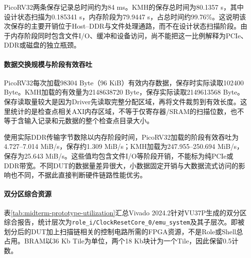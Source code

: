 PicoRV32两条保存记录总时间约为84 ms。KMH的保存总时间为80.1357 s，其中设计状态扫描为0.185341 s，内存阶段为79.9447 s，占总时间约99.76\%。这说明该次保存的主要开销位于Host--DDR与文件处理通路，而不在设计状态扫描阶段。由于内存阶段同时包含文件I/O、缓冲和设备访问，尚不能把这一比例解释为PCIe、DDR或磁盘的独立瓶颈。

\paragraph{数据交换规模与阶段有效吞吐}

PicoRV32每次加载98304 Byte（96 KiB）有效内存数据，保存时实际读取102400 Byte。KMH加载的有效量为2148638720 Byte，保存实际读取2149613568 Byte。保存读取量较大是因为Driver先读取完整分配区域，再将文件裁剪到有效长度。这里统计的是检查点相关AXI内存区域，不等于仅寄存器/SRAM的扫描位数，也不等于含输入记录和元数据的整个检查点目录大小。

使用实际DDR传输字节数除以内存阶段时间，PicoRV32加载的阶段有效吞吐为4.727--7.014 MiB/s，保存约1.309 MiB/s；KMH加载为247.955--250.694 MiB/s，保存为25.643 MiB/s。这些值均包含文件I/O等阶段开销，不能标为纯PCIe或DDR带宽。不同DUT的数据量差异很大，小数据固定开销与大数据流式访问的影响也不同，不据此直接判断硬件链路性能优劣。


\paragraph{双分区综合资源}

表\ref{tab:midterm-prototype-utilization}汇总Vivado 2024.2针对VU37P生成的双分区综合报告，统计层次为\texttt{role\_i/ClockResetCore\_0/emu\_system}及其子层次。即被划分后的DUT加上扫描链相关的控制电路所需的FPGA资源，不是Role或Shell总占用。BRAM以36 Kb Tile为单位，两个18 Kb块计为一个Tile，因此保留0.5计数。

